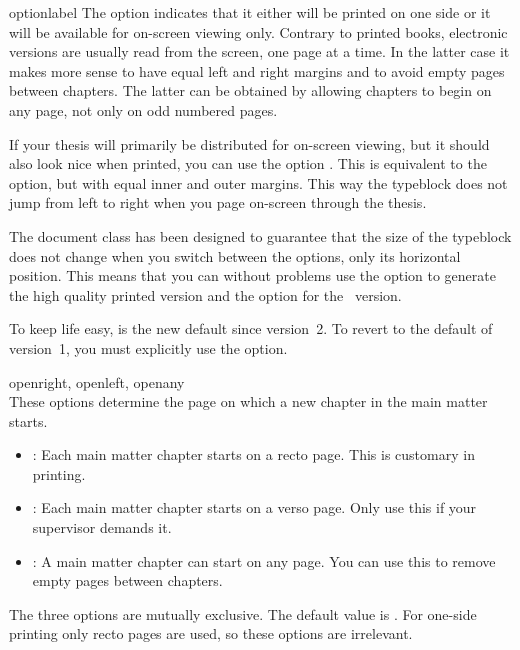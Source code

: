 \begin{labelled}{optionlabel}
  The  option indicates that it either will be printed on one side
  or it will be available for on-screen viewing only. Contrary to printed
  books, electronic versions are usually read from the screen, one page at a
  time. In the latter case it makes more sense to have equal left and right
  margins and to avoid empty pages between chapters. The latter can be obtained
  by allowing chapters to begin on any page, not only on odd numbered pages.

  If your thesis will primarily be distributed for on-screen viewing, but it
  should also look nice when printed, you can use the option
  . This is equivalent to the 
  option, but with equal inner and outer margins. This way the typeblock
  does not jump from left to right when you page on-screen through the thesis.

  The  document class has been designed to guarantee that the size
  of the typeblock does not change when you switch between the options, only
  its horizontal position. This means that you can without problems use the
   option to generate the high quality printed version and the
   option for the \PDF\ version.

  To keep life easy,  is the new default since
  version~2. To revert to the default of version~1, you must explicitly use
  the  option.

\item[openright, openleft, openany]
  \\
  These options determine the page on which a new chapter in the main
  matter starts.
  \begin{itemize}
  \item {}: Each main matter chapter starts on a recto page. This
    is customary in printing.
  \item {}: Each main matter chapter starts on a verso page. Only
    use this if your supervisor demands it.
  \item {}: A main matter chapter can start on any page. You can use
    this to remove empty pages between chapters.
  \end{itemize}

  The three options are mutually exclusive. The default value is
  . For one-side printing only recto pages are used, so
  these options are irrelevant.


\end{labelled}
